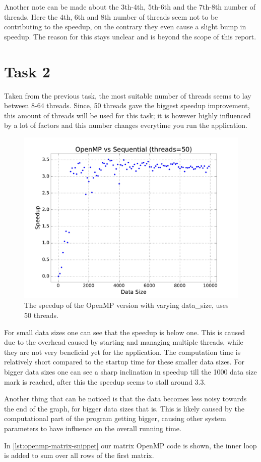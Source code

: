\documentclass[final]{report}
\begin{document}
Another note can be made about the 3th-4th, 5th-6th and the 7th-8th number of threads.
Here the 4th, 6th and 8th number of threads seem not to be contributing to the speedup, on the contrary they even cause a slight bump in speedup.
The reason for this stays unclear and is beyond the scope of this report.

\section{Task 2}
Taken from the previous task, the most suitable number of threads seems to lay between 8-64 threads.
Since, 50 threads gave the biggest speedup improvement, this amount of threads will be used for this task; it is however highly influenced by a lot of factors and this number changes everytime you run the application.

\begin{figure}[H]
\centering
    \includegraphics[width=\linewidth]{resources/openmp-data-size-sweep.pdf}
    \caption{The speedup of the OpenMP version with varying data\_size, uses 50 threads.}
    \label{fig:openmp-data-size-sweep}
\end{figure}

For small data sizes one can see that the speedup is below one.
This is caused due to the overhead caused by starting and managing multiple threads, while they are not very beneficial yet for the application.
The computation time is relatively short compared to the startup time for these smaller data sizes. For bigger data sizes one can see a sharp inclination in speedup till the 1000 data size mark is reached, after this the speedup seems to stall around 3.3.

Another thing that can be noticed is that the data becomes less noisy towards the end of the graph, for bigger data sizes that is.
This is likely caused by the computational part of the program getting bigger, causing other system parameters to have influence on the overall running time.

In \cref{lst:openmp-matrix-snippet} our matrix OpenMP code is shown, the inner loop is added to sum over all rows of the first matrix.
\end{document}

